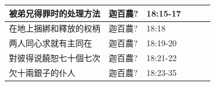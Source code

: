 \begin{table}[H]
\begin{tabular}{p{13.07em}|l|l|l|p{5.285em}|r}
被弟兄得罪时的处理方法& \multicolumn{1}{p{7.93em}|}{迦百農?} &\multicolumn{1}{p{5.285em}|}{18:15-17}&&  &  \\\midrule

在地上捆綁和釋放的权柄& \multicolumn{1}{p{7.93em}|}{迦百農?} &\multicolumn{1}{p{5.285em}|}{18:18}&&  &  \\\midrule
两人同心求就有主同在& \multicolumn{1}{p{7.93em}|}{迦百農?} &\multicolumn{1}{p{5.285em}|}{18:19-20}&&  &  \\\midrule
對彼得说饒恕七十個七次& \multicolumn{1}{p{7.93em}|}{迦百農?} &\multicolumn{1}{p{5.285em}|}{18:21-22}&&  &  \\\midrule
欠十兩銀子的仆人& \multicolumn{1}{p{7.93em}|}{迦百農?} &\multicolumn{1}{p{5.285em}|}{18:23-35}&&  &  \\\midrule
\end{tabular}
\end{table}%


